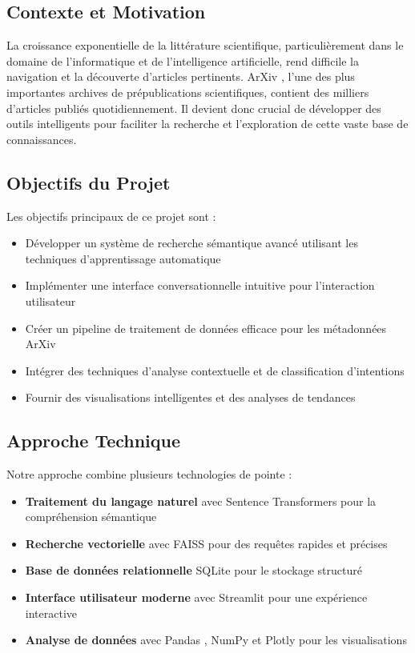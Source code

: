 \documentclass[12pt,a4paper]{article}
\begin{document}
\subsection{Contexte et Motivation}

La croissance exponentielle de la littérature scientifique, particulièrement dans le domaine de l'informatique et de l'intelligence artificielle, rend difficile la navigation et la découverte d'articles pertinents. ArXiv \cite{arxiv}, l'une des plus importantes archives de prépublications scientifiques, contient des milliers d'articles publiés quotidiennement. Il devient donc crucial de développer des outils intelligents pour faciliter la recherche et l'exploration de cette vaste base de connaissances.

\subsection{Objectifs du Projet}

Les objectifs principaux de ce projet sont :
\begin{itemize}
    \item Développer un système de recherche sémantique avancé utilisant les techniques d'apprentissage automatique
    \item Implémenter une interface conversationnelle intuitive pour l'interaction utilisateur
    \item Créer un pipeline de traitement de données efficace pour les métadonnées ArXiv
    \item Intégrer des techniques d'analyse contextuelle et de classification d'intentions
    \item Fournir des visualisations intelligentes et des analyses de tendances
\end{itemize}

\subsection{Approche Technique}

Notre approche combine plusieurs technologies de pointe :
\begin{itemize}
    \item \textbf{Traitement du langage naturel} avec Sentence Transformers \cite{reimers2019sentencebert} pour la compréhension sémantique
    \item \textbf{Recherche vectorielle} avec FAISS \cite{johnson2019billion} pour des requêtes rapides et précises
    \item \textbf{Base de données relationnelle} SQLite \cite{sqlite} pour le stockage structuré
    \item \textbf{Interface utilisateur moderne} avec Streamlit \cite{streamlit} pour une expérience interactive
    \item \textbf{Analyse de données} avec Pandas \cite{pandas}, NumPy \cite{numpy} et Plotly \cite{plotly} pour les visualisations
\end{itemize}
\end{document}
